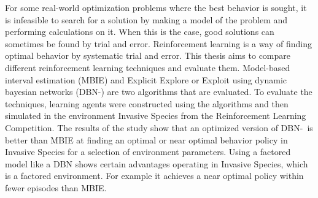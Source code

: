 For some real-world optimization problems where the best behavior is sought, it is infeasible to search for a solution by making a model of the problem and performing calculations on it. When this is the case, good solutions can sometimes be found by trial and error. 
Reinforcement learning is a way of finding optimal behavior by systematic trial and error.
This thesis aims to compare different reinforcement learning techniques and evaluate them. 
Model-based interval estimation (MBIE) and Explicit Explore or Exploit using dynamic bayesian networks (DBN-\etre)
 are two algorithms that are evaluated. 
To evaluate the techniques, learning agents were constructed using the algorithms and 
then simulated in the environment Invasive Species from the Reinforcement Learning Competition.
The results of the study show that an optimized version of DBN-\etre\ is better than MBIE at finding an optimal or near optimal behavior policy in Invasive Species for a selection of environment parameters.
Using a factored model like a DBN shows certain advantages operating in 
Invasive Species, which is a factored environment. For example it achieves a near optimal
policy within fewer episodes than MBIE.






